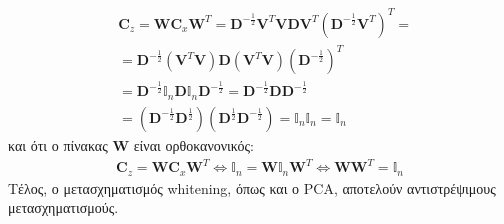 \begin{align*}
&\mathbf{C}_z = \mathbf{W} \mathbf{C}_x \mathbf{W}^T = 
\mathbf{D}^{- \frac{1}{2}} \mathbf{V}^T \mathbf{V} \mathbf{D} \mathbf{V}^T \left ( \mathbf{D}^{- \frac{1}{2}} \mathbf{V}^T  \right ) ^T = \\
&=\mathbf{D}^{- \frac{1}{2}} \left ( \mathbf{V}^T \mathbf{V}  \right ) \mathbf{D} \left ( \mathbf{V}^T \mathbf{V} \right ) (\mathbf{D}^{- \frac{1}{2}})^T \\
&= \mathbf{D}^{- \frac{1}{2}} \mathbb{I}_n \mathbf{D} \mathbb{I}_n \mathbf{D}^{- \frac{1}{2}} = \mathbf{D}^{- \frac{1}{2}} \mathbf{D} 
\mathbf{D}^{- \frac{1}{2}} \\
& = \left ( \mathbf{D}^{- \frac{1}{2}} \mathbf{D}^{\frac{1}{2}} \right ) \left ( \mathbf{D}^{\frac{1}{2}} \mathbf{D}^{- \frac{1}{2}} \right ) = \mathbb{I}_n \mathbb{I}_n = \mathbb{I}_n
\end{align*} \gr
και ότι ο πίνακας \en $\mathbf{W}$ \gr είναι ορθοκανονικός: \en
\begin{align*}
    \mathbf{C}_z = \mathbf{W} \mathbf{C}_x \mathbf{W}^T \Leftrightarrow \mathbb{I}_n = \mathbf{W} \mathbb{I}_n \mathbf{W}^T \Leftrightarrow \mathbf{W} \mathbf{W}^T = \mathbb{I}_n
\end{align*}
\gr Τέλος, ο μετασχηματισμός \en whitening, \gr όπως και ο \en PCA, \gr αποτελούν αντιστρέψιμους μετασχηματισμούς.

